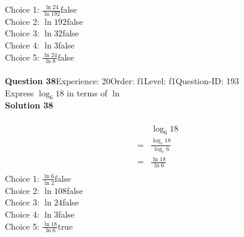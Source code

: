 \documentclass{article}
\begin{document}
Choice 1: \hspace{20pt}$\displaystyle\frac{\ln24}{\ln192}$\hspace{20pt}false\\
Choice 2: \hspace{20pt}$\ln{192}$\hspace{20pt}false\\
Choice 3: \hspace{20pt}$\ln{32}$\hspace{20pt}false\\
Choice 4: \hspace{20pt}$\ln{3}$\hspace{20pt}false\\
Choice 5: \hspace{20pt}$\displaystyle\frac{\ln24}{\ln8}$\hspace{20pt}false\\
\\[4pt]
\noindent\textbf{Question 38}\hspace{20pt}Experience: 20\hspace{20pt}Order: f1\hspace{20pt}Level: f1\hspace{20pt}Question-ID: 193\\[2pt]
Express $\log_{6}18$ in terms of $\ln$\\[4pt]
\noindent\textbf{Solution 38}\\[2pt]
\\[-35pt]\begin{align*}
&\log_{6}18\\[2pt]
=&\displaystyle\frac{\log_{e}18}{\log_{e}6}\\[2pt]
=&\displaystyle\frac{\ln18}{\ln6}\\[-100pt]
\end{align*}
Choice 1: \hspace{20pt}$\displaystyle\frac{\ln6}{\ln2}$\hspace{20pt}false\\
Choice 2: \hspace{20pt}$\ln{108}$\hspace{20pt}false\\
Choice 3: \hspace{20pt}$\ln{24}$\hspace{20pt}false\\
Choice 4: \hspace{20pt}$\ln{3}$\hspace{20pt}false\\
Choice 5: \hspace{20pt}$\displaystyle\frac{\ln18}{\ln6}$\hspace{20pt}true\\
\end{document}
